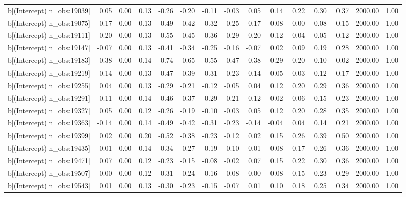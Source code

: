 \begin{table}[ht]
\begin{tabular}{rrrrrrrrrrrrrrr}
  b[(Intercept) n\_obs:19039] & 0.05 & 0.00 & 0.13 & -0.26 & -0.20 & -0.11 & -0.03 & 0.05 & 0.14 & 0.22 & 0.30 & 0.37 & 2000.00 & 1.00 \\ 
  b[(Intercept) n\_obs:19075] & -0.17 & 0.00 & 0.13 & -0.49 & -0.42 & -0.32 & -0.25 & -0.17 & -0.08 & -0.00 & 0.08 & 0.15 & 2000.00 & 1.00 \\ 
  b[(Intercept) n\_obs:19111] & -0.20 & 0.00 & 0.13 & -0.55 & -0.45 & -0.36 & -0.29 & -0.20 & -0.12 & -0.04 & 0.05 & 0.12 & 2000.00 & 1.00 \\ 
  b[(Intercept) n\_obs:19147] & -0.07 & 0.00 & 0.13 & -0.41 & -0.34 & -0.25 & -0.16 & -0.07 & 0.02 & 0.09 & 0.19 & 0.28 & 2000.00 & 1.00 \\ 
  b[(Intercept) n\_obs:19183] & -0.38 & 0.00 & 0.14 & -0.74 & -0.65 & -0.55 & -0.47 & -0.38 & -0.29 & -0.20 & -0.10 & -0.02 & 2000.00 & 1.00 \\ 
  b[(Intercept) n\_obs:19219] & -0.14 & 0.00 & 0.13 & -0.47 & -0.39 & -0.31 & -0.23 & -0.14 & -0.05 & 0.03 & 0.12 & 0.17 & 2000.00 & 1.00 \\ 
  b[(Intercept) n\_obs:19255] & 0.04 & 0.00 & 0.13 & -0.29 & -0.21 & -0.12 & -0.05 & 0.04 & 0.12 & 0.20 & 0.29 & 0.36 & 2000.00 & 1.00 \\ 
  b[(Intercept) n\_obs:19291] & -0.11 & 0.00 & 0.14 & -0.46 & -0.37 & -0.29 & -0.21 & -0.12 & -0.02 & 0.06 & 0.15 & 0.23 & 2000.00 & 1.00 \\ 
  b[(Intercept) n\_obs:19327] & 0.05 & 0.00 & 0.12 & -0.26 & -0.19 & -0.10 & -0.03 & 0.05 & 0.12 & 0.20 & 0.28 & 0.35 & 2000.00 & 1.00 \\ 
  b[(Intercept) n\_obs:19363] & -0.14 & 0.00 & 0.14 & -0.49 & -0.42 & -0.31 & -0.23 & -0.14 & -0.04 & 0.04 & 0.14 & 0.21 & 2000.00 & 1.00 \\ 
  b[(Intercept) n\_obs:19399] & 0.02 & 0.00 & 0.20 & -0.52 & -0.38 & -0.23 & -0.12 & 0.02 & 0.15 & 0.26 & 0.39 & 0.50 & 2000.00 & 1.00 \\ 
  b[(Intercept) n\_obs:19435] & -0.01 & 0.00 & 0.14 & -0.34 & -0.27 & -0.19 & -0.10 & -0.01 & 0.08 & 0.17 & 0.26 & 0.36 & 2000.00 & 1.00 \\ 
  b[(Intercept) n\_obs:19471] & 0.07 & 0.00 & 0.12 & -0.23 & -0.15 & -0.08 & -0.02 & 0.07 & 0.15 & 0.22 & 0.30 & 0.36 & 2000.00 & 1.00 \\ 
  b[(Intercept) n\_obs:19507] & -0.00 & 0.00 & 0.12 & -0.31 & -0.24 & -0.16 & -0.08 & -0.00 & 0.08 & 0.15 & 0.23 & 0.29 & 2000.00 & 1.00 \\ 
  b[(Intercept) n\_obs:19543] & 0.01 & 0.00 & 0.13 & -0.30 & -0.23 & -0.15 & -0.07 & 0.01 & 0.10 & 0.18 & 0.25 & 0.34 & 2000.00 & 1.00 \\ 

\end{tabular}
\end{table}
